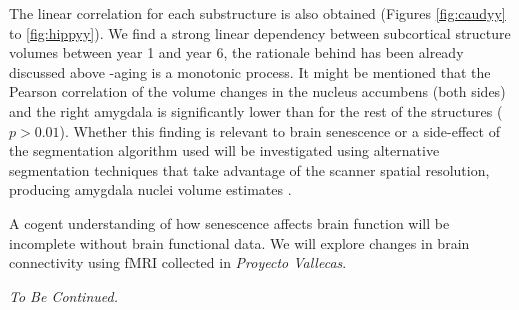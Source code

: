 \documentclass[11pt]{article}
\theoremstyle{definition}
\theoremstyle{remark}
\begin{document}
The linear correlation for each substructure is also obtained (Figures \ref{fig:caudyy} to \ref{fig:hippyy}). We find a strong linear dependency between subcortical structure volumes  between year 1 and year 6, the rationale behind has been already discussed above -aging is a monotonic process. It might be mentioned that the Pearson correlation of the volume changes in the nucleus accumbens (both sides) and the right amygdala is significantly lower than for the rest of the structures ($p >0.01$). Whether this finding is relevant to brain senescence or a side-effect of the segmentation algorithm used will be investigated using alternative segmentation techniques that take advantage of the scanner spatial resolution, producing amygdala nuclei volume estimates \cite{iglesias2015computational}.  

A cogent understanding of how senescence affects brain function will be incomplete without brain functional data. We will explore changes in brain connectivity using fMRI collected in \emph{Proyecto Vallecas}.

\emph{To Be Continued.}

\newpage
{}



\end{document}
